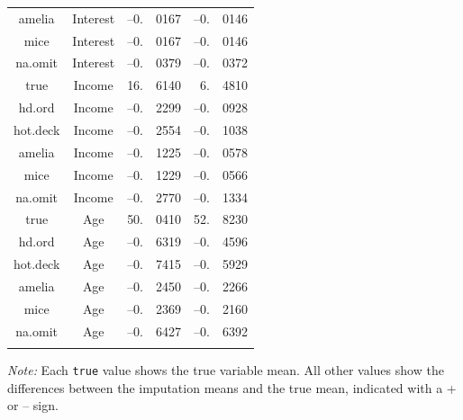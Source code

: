 \documentclass[12pt,econ]{sources/authesis}
\begin{document}
\begin{table}[!htbp]
\begin{threeparttable}
\begin{tabular}{ccr@{}lr@{}l}
 amelia & Interest & --0.&0167 & --0.&0146 \\
 mice & Interest & --0.&0167 & --0.&0146 \\
 na.omit & Interest & --0.&0379 & --0.&0372 \\
 true & Income & 16.&6140 & 6.&4810 \\
 hd.ord & Income & --0.&2299 & --0.&0928 \\ 
 hot.deck & Income & --0.&2554 & --0.&1038 \\
 amelia & Income & --0.&1225 & --0.&0578 \\
 mice & Income & --0.&1229 & --0.&0566 \\
 na.omit & Income & --0.&2770 & --0.&1334 \\
 true & Age & 50.&0410 & 52.&8230 \\
 hd.ord & Age & --0.&6319 & --0.&4596 \\ 
 hot.deck & Age & --0.&7415 & --0.&5929 \\ 
 amelia & Age & --0.&2450 & --0.&2266 \\
 mice & Age & --0.&2369 & --0.&2160 \\ 
 na.omit & Age & --0.&6427 & --0.&6392 \\
 \hline \\[-1.8ex] 
\end{tabular} 
\begin{tablenotes}
\footnotesize{\textit{Note:} Each \texttt{true} value shows the true variable mean. All other values show the differences between the imputation means and the true mean, indicated with a + or -- sign.}
\end{tablenotes}
\end{threeparttable}
\end{table}
\end{document}
